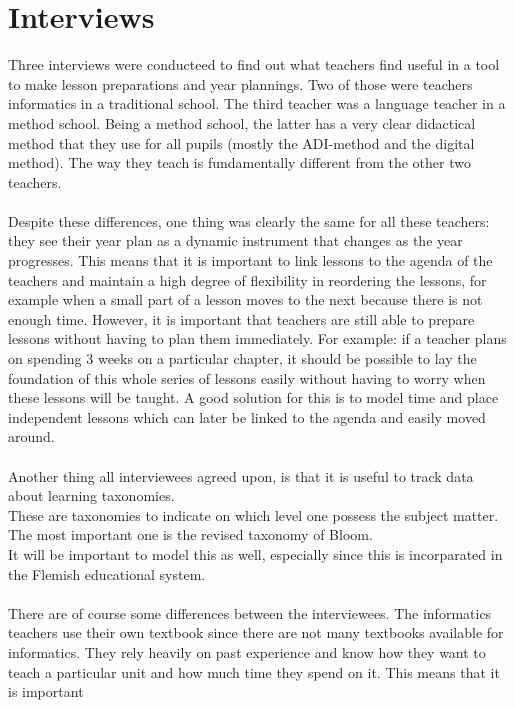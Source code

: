 \documentclass[a4paper]{report}
\begin{document}
    \section{Interviews}
    \label{subsection:interviews}
    Three interviews were conducteed to find out what teachers find useful in a tool to make lesson preparations and year plannings.
    Two of those were teachers informatics in a traditional school. The third teacher was a language teacher in a method school.
    Being a method school, the latter has a very clear didactical method that they use for all pupils (mostly the ADI-method and the digital method). The way they teach is fundamentally different from the other two teachers.\\ \\
    Despite these differences, one thing was clearly the same for all these teachers: they see their year plan as a dynamic instrument that changes as the year progresses.
    This means that it is important to link lessons to the agenda of the teachers and maintain a high degree of flexibility in reordering the lessons, for example when a small part of a lesson moves to the next because there is not enough time.
    However, it is important that teachers are still able to prepare lessons without having to plan them immediately.
    For example: if a teacher plans on spending 3 weeks on a particular chapter, it should be possible to lay the foundation of this whole series of lessons easily without having to worry when these lessons will be taught.
    A good solution for this is to model time and place independent lessons which can later be linked to the agenda and easily moved around.\\ \\
    Another thing all interviewees agreed upon, is that it is useful to track data about learning taxonomies.\\
    These are taxonomies to indicate on which level one possess the subject matter. The most important one is the revised taxonomy of Bloom.\\
    It will be important to model this as well, especially since this is incorparated in the Flemish educational system.\\ \\
    There are of course some differences between the interviewees. The informatics teachers use their own textbook since there are not many textbooks available for informatics.
    They rely heavily on past experience and know how they want to teach a particular unit and how much time they spend on it. This means that it is important
\end{document}
